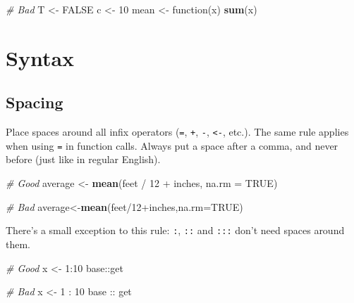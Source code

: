 \documentclass[]{book}
\newenvironment{Shaded}{\begin{snugshade}}{\end{snugshade}}
\newcommand{\KeywordTok}[1]{\textcolor[rgb]{0.13,0.29,0.53}{\textbf{{#1}}}}
\newcommand{\DataTypeTok}[1]{\textcolor[rgb]{0.13,0.29,0.53}{{#1}}}
\newcommand{\DecValTok}[1]{\textcolor[rgb]{0.00,0.00,0.81}{{#1}}}
\newcommand{\StringTok}[1]{\textcolor[rgb]{0.31,0.60,0.02}{{#1}}}
\newcommand{\CommentTok}[1]{\textcolor[rgb]{0.56,0.35,0.01}{\textit{{#1}}}}
\newcommand{\OtherTok}[1]{\textcolor[rgb]{0.56,0.35,0.01}{{#1}}}
\newcommand{\NormalTok}[1]{{#1}}
\begin{document}
\begin{Shaded}
\begin{Highlighting}[]
\CommentTok{# Bad}
\NormalTok{T <-}\StringTok{ }\OtherTok{FALSE}
\NormalTok{c <-}\StringTok{ }\DecValTok{10}
\NormalTok{mean <-}\StringTok{ }\NormalTok{function(x) }\KeywordTok{sum}\NormalTok{(x)}
\end{Highlighting}
\end{Shaded}

\chapter{Syntax}\label{style-syn}

\section{Spacing}\label{spacing}

Place spaces around all infix operators (\texttt{=}, \texttt{+},
\texttt{-}, \texttt{\textless{}-}, etc.). The same rule applies when
using \texttt{=} in function calls. Always put a space after a comma,
and never before (just like in regular English).

\begin{Shaded}
\begin{Highlighting}[]
\CommentTok{# Good}
\NormalTok{average <-}\StringTok{ }\KeywordTok{mean}\NormalTok{(feet /}\StringTok{ }\DecValTok{12} \NormalTok{+}\StringTok{ }\NormalTok{inches, }\DataTypeTok{na.rm =} \OtherTok{TRUE}\NormalTok{)}

\CommentTok{# Bad}
\NormalTok{average<-}\KeywordTok{mean}\NormalTok{(feet/}\DecValTok{12}\NormalTok{+inches,}\DataTypeTok{na.rm=}\OtherTok{TRUE}\NormalTok{)}
\end{Highlighting}
\end{Shaded}

There's a small exception to this rule: \texttt{:}, \texttt{::} and
\texttt{:::} don't need spaces around them.

\begin{Shaded}
\begin{Highlighting}[]
\CommentTok{# Good}
\NormalTok{x <-}\StringTok{ }\DecValTok{1}\NormalTok{:}\DecValTok{10}
\NormalTok{base::get}

\CommentTok{# Bad}
\NormalTok{x <-}\StringTok{ }\DecValTok{1} \NormalTok{:}\StringTok{ }\DecValTok{10}
\NormalTok{base ::}\StringTok{ }\NormalTok{get}
\end{Highlighting}
\end{Shaded}
\end{document}
